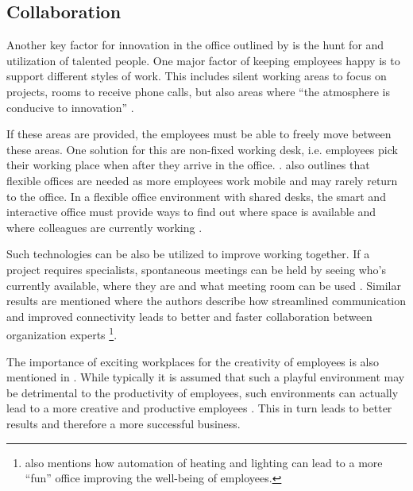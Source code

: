 \subsection{Collaboration}\label{sec:collaboration}
Another key factor for innovation in the office outlined by \cite{hub13} is the hunt for and utilization of talented people. One major factor of keeping employees happy is to support different styles of work. This includes silent working areas to focus on projects, rooms to receive phone calls, but also areas where ``the atmosphere is conducive to innovation'' \cite{tieto}.

If these areas are provided, the employees must be able to freely move between these areas. One solution for this are non-fixed working desk, i.e. employees pick their working place when after they arrive in the office. \cite{occupiee}.  also outlines that flexible offices are needed as more employees work mobile and may rarely return to the office. In a flexible office environment with shared desks, the smart and interactive office must provide ways to find out where space is available and where colleagues are currently working \cite{tieto}.

Such technologies can be also be utilized to improve working together. If a project requires specialists, spontaneous meetings can be held by seeing who's currently available, where they are and what meeting room can be used \cite{tieto}. Similar results are mentioned \cite{hbcommunications} where the authors describe how streamlined communication and improved connectivity leads to better and faster collaboration between organization experts \footnote{\cite{hbcommunications} also mentions how automation of heating and lighting can lead to a more ``fun'' office improving the well-being of employees.}.

The importance of exciting workplaces for the creativity of employees is also mentioned in \cite{roomzilla3}. While typically it is assumed that such a playful environment may be detrimental to the productivity of employees, such environments can actually lead to a more creative and productive employees \cite{metroffice}. This in turn leads to better results and therefore a more successful business.


